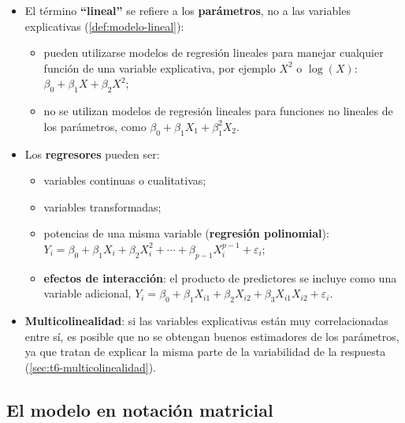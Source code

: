 \begin{itemize}
  \item El término \textbf{``lineal''} se refiere a los \textbf{parámetros}, no a las variables
    explicativas (\cref{def:modelo-lineal}):
    \begin{itemize}
      \item pueden utilizarse modelos de regresión lineales para manejar cualquier función de
        una variable explicativa, por ejemplo $X^2$ o $\log(X)$: $\beta_0+\beta_1X+\beta_2X^2$;
      \item no se utilizan modelos de regresión lineales para funciones no lineales de los
        parámetros, como $\beta_0+\beta_1X_1+\beta_1^2X_2$.
    \end{itemize}
  \item Los \textbf{regresores} pueden ser:
    \begin{itemize}
      \item variables continuas o cualitativas;
      \item variables transformadas;
      \item potencias de una misma variable (\textbf{regresión polinomial}):
        $Y_i=\beta_0+\beta_1X_i+\beta_2X_i^2+\cdots+\beta_{p-1}X_i^{p-1}+\varepsilon_i$;
      \item \textbf{efectos de interacción}: el producto de predictores se incluye como una
        variable adicional, $Y_i=\beta_0+\beta_1X_{i1}+\beta_2X_{i2}+\beta_3X_{i1}X_{i2}+\varepsilon_i$.
    \end{itemize}
  \item \textbf{Multicolinealidad}: si las variables explicativas están muy correlacionadas entre
    sí, es posible que no se obtengan buenos estimadores de los parámetros, ya que tratan de
    explicar la misma parte de la variabilidad de la respuesta (\cref{sec:t6-multicolinealidad}).
\end{itemize}

\subsection{El modelo en notación matricial}
\label{sec:t6-matricial}

